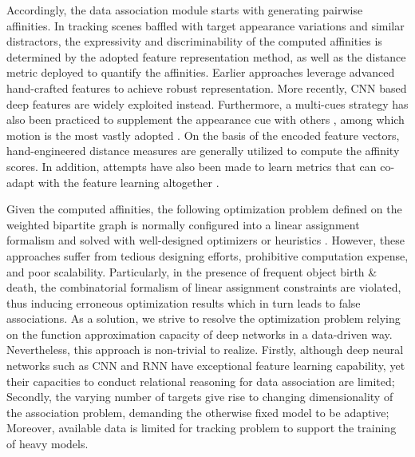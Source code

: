 \documentclass[10pt,twocolumn,letterpaper]{article}
\begin{document}
Accordingly, the data association module starts with generating pairwise affinities. In tracking scenes baffled with target appearance variations and similar distractors, the expressivity and discriminability of the computed affinities is determined by the adopted feature representation method, as well as the distance metric deployed to quantify the affinities. Earlier approaches leverage advanced hand-crafted features \cite{HandAppr1, HandAppr2, HandAppr3} to achieve robust representation. More recently, CNN based deep features are widely exploited \cite{MulticutTang2017, Eccv18BilinaerLSTM, CVPR2017Quadruplet,  PAMI2018DeepApprMOT} instead. Furthermore, a multi-cues strategy has also been practiced to supplement the appearance cue with others \cite{LearnedApprCVPR2010, HandAppr2, TwoStream1}, among which motion is the most vastly adopted \cite{TwoStream2, TwoStream3, TwoStream4, TrackingTheUntrackable, jiang2019model}. On the basis of the encoded feature vectors, hand-engineered distance measures \cite{HandAppr1, BhattacharyyaDist1, BhattacharyyaDist2} are generally utilized to compute the affinity scores. In addition, attempts have also been made to learn metrics that can co-adapt with the feature learning altogether \cite{MWIS2011, TrackingTheUntrackable, Icip2018MOTSiameseLSTM}.

Given the computed affinities, the following optimization problem defined on the weighted bipartite graph is normally configured into a linear assignment formalism and solved with well-designed optimizers or heuristics \cite{BM1WACV2014, BM2ShahCVPR2012}. However, these approaches suffer from tedious designing efforts, prohibitive computation expense, and poor scalability. Particularly, in the presence of frequent object birth \& death, the combinatorial formalism of linear assignment constraints are violated, thus inducing erroneous optimization results which in turn leads to false associations. As a solution, we strive to resolve the optimization problem relying on the function approximation capacity of deep networks in a data-driven way. Nevertheless, this approach is non-trivial to realize. Firstly, although deep neural networks such as CNN and RNN have exceptional feature learning capability, yet their capacities to conduct relational reasoning for data association are limited; Secondly, the varying number of targets give rise to changing dimensionality of the association problem, demanding the otherwise fixed model to be adaptive; Moreover, available data is limited for tracking problem to support the training of heavy models.
\end{document}
